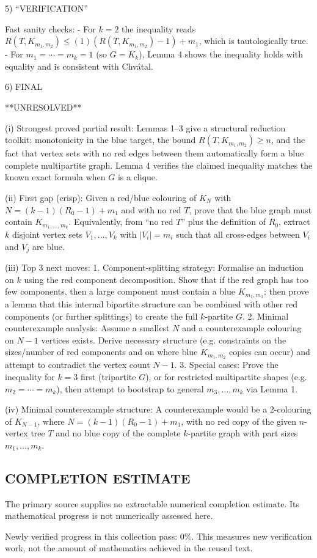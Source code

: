 5) “VERIFICATION”

Fast sanity checks:
- For $k=2$ the inequality reads $R(T,K_{m_1,m_2})\le (1)(R(T,K_{m_1,m_2})-1)+m_1$, which is tautologically true.
- For $m_1=\cdots=m_k=1$ (so $G=K_k$), Lemma 4 shows the inequality holds with equality and is consistent with Chv\'atal.

6) FINAL

**UNRESOLVED**

(i) Strongest proved partial result: Lemmas 1–3 give a structural reduction toolkit: monotonicity in the blue target, the bound $R(T,K_{m_1,m_2})\ge n$, and the fact that vertex sets with no red edges between them automatically form a blue complete multipartite graph. Lemma 4 verifies the claimed inequality matches the known exact formula when $G$ is a clique.

(ii) First gap (crisp): Given a red/blue colouring of $K_N$ with $N=(k-1)(R_0-1)+m_1$ and with no red $T$, prove that the blue graph must contain $K_{m_1,\dots,m_k}$. Equivalently, from “no red $T$” plus the definition of $R_0$, extract $k$ disjoint vertex sets $V_1,\dots,V_k$ with $|V_i|=m_i$ such that all cross-edges between $V_i$ and $V_j$ are blue.

(iii) Top 3 next moves:
1. Component-splitting strategy: Formalise an induction on $k$ using the red component decomposition. Show that if the red graph has too few components, then a large component must contain a blue $K_{m_1,m_2}$; then prove a lemma that this internal bipartite structure can be combined with other red components (or further splittings) to create the full $k$-partite $G$.
2. Minimal counterexample analysis: Assume a smallest $N$ and a counterexample colouring on $N-1$ vertices exists. Derive necessary structure (e.g. constraints on the sizes/number of red components and on where blue $K_{m_1,m_2}$ copies can occur) and attempt to contradict the vertex count $N-1$.
3. Special cases: Prove the inequality for $k=3$ first (tripartite $G$), or for restricted multipartite shapes (e.g. $m_2=\cdots=m_k$), then attempt to bootstrap to general $m_3,\dots,m_k$ via Lemma 1.

(iv) Minimal counterexample structure: A counterexample would be a 2-colouring of $K_{N-1}$, where $N=(k-1)(R_0-1)+m_1$, with no red copy of the given $n$-vertex tree $T$ and no blue copy of the complete $k$-partite graph with part sizes $m_1,\dots,m_k$.



\subsection*{COMPLETION ESTIMATE}
The primary source supplies no extractable numerical completion estimate. Its mathematical progress is not numerically assessed here.

Newly verified progress in this collection pass: $0\%$. This measures new verification work, not the amount of mathematics achieved in the reused text.
